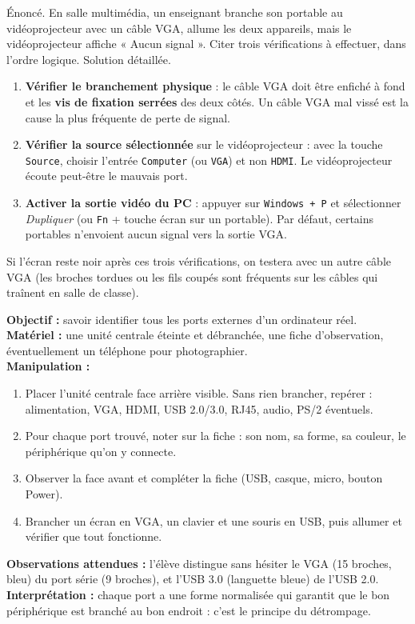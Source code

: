 \documentclass[11pt]{article}
\begin{document}
\begin{exoresolu}
Énoncé. En salle multimédia, un enseignant branche son portable au vidéoprojecteur avec un câble VGA, allume les deux appareils, mais le vidéoprojecteur affiche « Aucun signal ». Citer trois vérifications à effectuer, dans l'ordre logique.
\tcblower
Solution détaillée.
\begin{enumerate}
  \item \textbf{Vérifier le branchement physique} : le câble VGA doit être enfiché à fond et les \textbf{vis de fixation serrées} des deux côtés. Un câble VGA mal vissé est la cause la plus fréquente de perte de signal.
  \item \textbf{Vérifier la source sélectionnée} sur le vidéoprojecteur : avec la touche \texttt{Source}, choisir l'entrée \texttt{Computer} (ou \texttt{VGA}) et non \texttt{HDMI}. Le vidéoprojecteur écoute peut-être le mauvais port.
  \item \textbf{Activer la sortie vidéo du PC} : appuyer sur \texttt{Windows + P} et sélectionner \emph{Dupliquer} (ou \texttt{Fn} + touche écran sur un portable). Par défaut, certains portables n'envoient aucun signal vers la sortie VGA.
\end{enumerate}
Si l'écran reste noir après ces trois vérifications, on testera avec un autre câble VGA (les broches tordues ou les fils coupés sont fréquents sur les câbles qui traînent en salle de classe).
\end{exoresolu}

\begin{experience}
\textbf{Objectif :} savoir identifier tous les ports externes d'un ordinateur réel.\\
\textbf{Matériel :} une unité centrale éteinte et débranchée, une fiche d'observation, éventuellement un téléphone pour photographier.\\
\textbf{Manipulation :}
\begin{enumerate}
  \item Placer l'unité centrale face arrière visible. Sans rien brancher, repérer : alimentation, VGA, HDMI, USB 2.0/3.0, RJ45, audio, PS/2 éventuels.
  \item Pour chaque port trouvé, noter sur la fiche : son nom, sa forme, sa couleur, le périphérique qu'on y connecte.
  \item Observer la face avant et compléter la fiche (USB, casque, micro, bouton Power).
  \item Brancher un écran en VGA, un clavier et une souris en USB, puis allumer et vérifier que tout fonctionne.
\end{enumerate}
\textbf{Observations attendues :} l'élève distingue sans hésiter le VGA (15 broches, bleu) du port série (9 broches), et l'USB 3.0 (languette bleue) de l'USB 2.0.\\
\textbf{Interprétation :} chaque port a une forme normalisée qui garantit que le bon périphérique est branché au bon endroit : c'est le principe du détrompage.
\end{experience}
\end{document}
